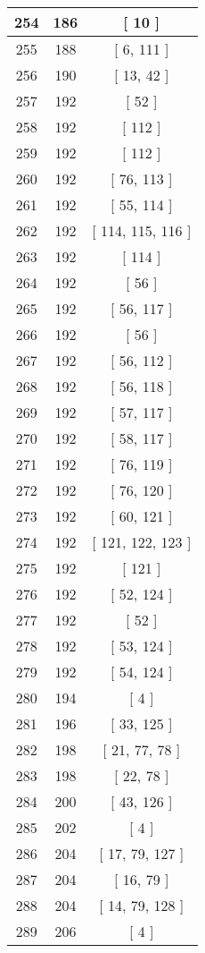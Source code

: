 \begin{center}
\begin{longtable}[H]{|| c c c ||}
\hline
254 & 186 & [ 10 ] \\ 
\hline
255 & 188 & [ 6, 111 ] \\ 
\hline
256 & 190 & [ 13, 42 ] \\ 
\hline
257 & 192 & [ 52 ] \\ 
\hline
258 & 192 & [ 112 ] \\ 
\hline
259 & 192 & [ 112 ] \\ 
\hline
260 & 192 & [ 76, 113 ] \\ 
\hline
261 & 192 & [ 55, 114 ] \\ 
\hline
262 & 192 & [ 114, 115, 116 ] \\ 
\hline
263 & 192 & [ 114 ] \\ 
\hline
264 & 192 & [ 56 ] \\ 
\hline
265 & 192 & [ 56, 117 ] \\ 
\hline
266 & 192 & [ 56 ] \\ 
\hline
267 & 192 & [ 56, 112 ] \\ 
\hline
268 & 192 & [ 56, 118 ] \\ 
\hline
269 & 192 & [ 57, 117 ] \\ 
\hline
270 & 192 & [ 58, 117 ] \\ 
\hline
271 & 192 & [ 76, 119 ] \\ 
\hline
272 & 192 & [ 76, 120 ] \\ 
\hline
273 & 192 & [ 60, 121 ] \\ 
\hline
274 & 192 & [ 121, 122, 123 ] \\ 
\hline
275 & 192 & [ 121 ] \\ 
\hline
276 & 192 & [ 52, 124 ] \\ 
\hline
277 & 192 & [ 52 ] \\ 
\hline
278 & 192 & [ 53, 124 ] \\ 
\hline
279 & 192 & [ 54, 124 ] \\ 
\hline
280 & 194 & [ 4 ] \\ 
\hline
281 & 196 & [ 33, 125 ] \\ 
\hline
282 & 198 & [ 21, 77, 78 ] \\ 
\hline
283 & 198 & [ 22, 78 ] \\ 
\hline
284 & 200 & [ 43, 126 ] \\ 
\hline
285 & 202 & [ 4 ] \\ 
\hline
286 & 204 & [ 17, 79, 127 ] \\ 
\hline
287 & 204 & [ 16, 79 ] \\ 
\hline
288 & 204 & [ 14, 79, 128 ] \\ 
\hline
289 & 206 & [ 4 ] \\ 

\end{longtable}
\end{center}
